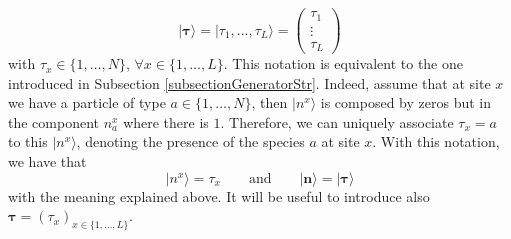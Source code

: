\documentclass[10pt]{article}
\numberwithin{equation}{section}
\numberwithin{equation}{subsection}
\begin{document}
\begin{equation}\label{Tau-Notation}
	|\bm{\tau}\rangle=|\tau_{1},\ldots,\tau_{L}\rangle =\begin{pmatrix}
		\tau_{1}\\
		\vdots\\
		\tau_{L}
	\end{pmatrix}
\end{equation}
with $\tau_{x}\in \{1,\ldots,N\}$, $\forall x\in \{1,\ldots,L\}$. This notation is equivalent to the one introduced in Subsection \ref{subsectionGeneratorStr}. Indeed, assume that at site $x$ we have a particle of type $a\in\{1,\ldots,N\} $, then $|n^{x}\rangle$ is composed by zeros but in the component $n_{a}^{x}$ where there is $1$. Therefore, we can uniquely associate  $\tau_{x}=a$ to this $|n^{x}\rangle$, denoting the presence of the species $a$ at site $x$. With this notation, we have that 
\begin{equation}\label{notation}
	|n^{x}\rangle =\tau_{x}\qquad \text{and}\qquad|\bm{n}\rangle=|\bm{\tau}\rangle
\end{equation}
with the meaning explained above. It will be useful to introduce also $\bm{\tau}=(\tau_{x})_{x\in \{1,\ldots,L\}}$. 
\end{document}
